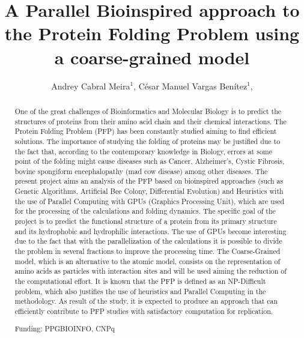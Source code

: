 \documentclass[twoside]{article}
\title{\vspace{-15mm}\fontsize{24pt}{10pt}\selectfont\textbf{ A Parallel Bioinspired approach to the Protein Folding Problem using a coarse-grained model }} %
\author{ Andrey Cabral Meira$^{1}$, César Manuel Vargas Benítez$^{1}$, }
\affil{ 1 UTFPR

 }
\date{}
\begin{document}
  
  
  \maketitle %
  
  
  \thispagestyle{fancy} %
  
  
  \begin{abstract}
  One of the great challenges of Bioinformatics and Molecular Biology is to predict the structures of proteins from their amino acid chain and their chemical interactions. The Protein Folding Problem (PFP) has been constantly studied aiming to find efficient solutions. The importance of studying the folding of proteins may be justified due to the fact that, according to the contemporary knowledge in Biology, errors at some point of the folding might cause  diseases such as Cancer, Alzheimer's, Cystic Fibrosis, bovine spongiform encephalopathy (mad cow disease) among other diseases. The present project aims an analysis of the PFP based on bioinspired approaches (such as Genetic Algorithms, Artificial Bee Colony, Differential Evolution) and Heuristics with the use of Parallel Computing with GPUs (Graphics Processing Unit), which are used for the processing of the calculations and folding dynamics. The specific goal of the project is to predict the functional structure of a protein from its primary structure and its hydrophobic and hydrophilic interactions. The use of GPUs become interesting due to the fact that with the parallelization of the calculations it is possible to divide the problem in several fractions to improve the processing time. The Coarse-Grained model, which is an alternative to the atomic model, consists on the representation of amino acids as particles with interaction sites and will be used aiming the reduction of the computational effort. It is known that the PFP is defined as an NP-Difficult problem, which also justifies the use of heuristics and Parallel Computing in the methodology. As result of the study, it is expected to produce an approach that can efficiently contribute to PFP studies with satisfactory computation for replication.
  
  Funding: PPGBIOINFO, CNPq \\ 
  \end{abstract}
  
\end{document}
